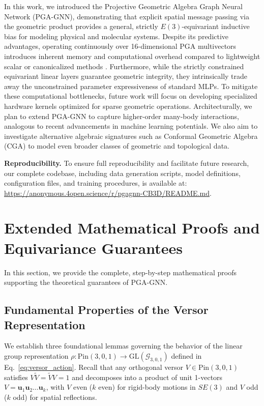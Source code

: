 \documentclass[10pt]{article}
\begin{document}
\noindent
In this work, we introduced the Projective Geometric Algebra Graph Neural Network (PGA-GNN), demonstrating that explicit spatial message passing via the geometric product provides a general, strictly $E(3)$-equivariant inductive bias for modeling physical and molecular systems. 
Despite its predictive advantages, operating continuously over 16-dimensional PGA multivectors introduces inherent memory and computational overhead compared to lightweight scalar or canonicalized methods \citep{egnn,loca}. Furthermore, while the strictly constrained equivariant linear layers guarantee geometric integrity, they intrinsically trade away the unconstrained parameter expressiveness of standard MLPs. To mitigate these computational bottlenecks, future work will focus on developing specialized hardware kernels optimized for sparse geometric operations. Architecturally, we plan to extend PGA-GNN to capture higher-order many-body interactions, analogous to recent advancements in machine learning potentials. We also aim to investigate alternative algebraic signatures such as Conformal Geometric Algebra (CGA) to model even broader classes of geometric and topological data.


\noindent
\textbf{Reproducibility.}
To ensure full reproducibility and facilitate future research, our complete codebase, including data generation scripts, model definitions, configuration files, and training procedures, is available at:
\url{https://anonymous.4open.science/r/pgagnn-CB3D/README.md}.




\newpage
\appendix

\section{Extended Mathematical Proofs and Equivariance Guarantees}
\label{app:proofs}

In this section, we provide the complete, step-by-step mathematical proofs supporting the theoretical guarantees of PGA-GNN.

\subsection{Fundamental Properties of the Versor Representation}

We establish three foundational lemmas governing the behavior of the linear group representation $\rho: \mathrm{Pin}(3,0,1) \to \mathrm{GL}(\mathcal{G}_{3,0,1})$ defined in Eq.~\ref{eq:versor_action}. Recall that any orthogonal versor $V \in \mathrm{Pin}(3,0,1)$ satisfies $V \widetilde{V} = \widetilde{V} V = 1$ and decomposes into a product of unit 1-vectors $V = \mathbf{u}_1 \mathbf{u}_2 \dots \mathbf{u}_k$, with $V$ even ($k$ even) for rigid-body motions in $SE(3)$ and $V$ odd ($k$ odd) for spatial reflections.
\end{document}

